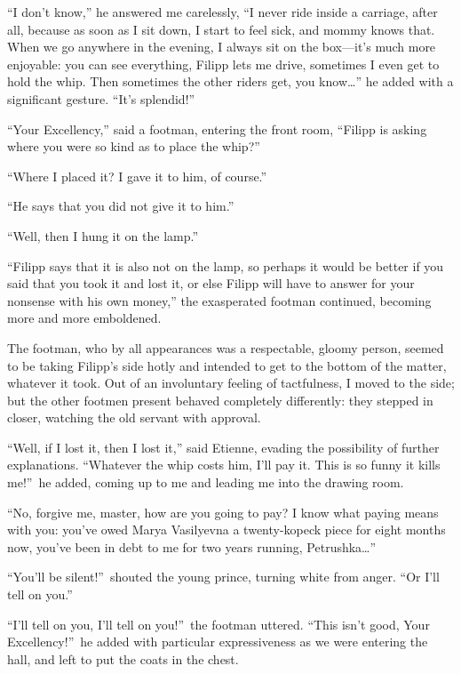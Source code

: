 ``I don't know,'' he answered me carelessly, ``I never ride inside a carriage, after all, because as soon as I sit down, I start to feel sick, and mommy knows that. When we go anywhere in the evening, I always sit on the box---it's much more enjoyable: you can see everything, Filipp lets me drive, sometimes I even get to hold the whip. Then sometimes the other riders get, you know\ldots{}'' he added with a significant gesture. ``It's splendid!'' %

``Your Excellency,'' said a footman, entering the front room, ``Filipp is asking where you were so kind as to place the whip?'' %

``Where I placed it? I gave it to him, of course.'' %

``He says that you did not give it to him.'' %

``Well, then I hung it on the lamp.'' %

``Filipp says that it is also not on the lamp, so perhaps it would be better if you said that you took it and lost it, or else Filipp will have to answer for your nonsense with his own money,'' the exasperated footman continued, becoming more and more emboldened. %

The footman, who by all appearances was a respectable, gloomy person, seemed to be taking Filipp's side hotly and intended to get to the bottom of the matter, whatever it took. Out of an involuntary feeling of tactfulness, I moved to the side; but the other footmen present behaved completely differently: they stepped in closer, watching the old servant with approval.

``Well, if I lost it, then I lost it,'' said Etienne, evading the possibility of further explanations. ``Whatever the whip costs him, I'll pay it. This is so funny it kills me!''~he added, coming up to me and leading me into the drawing room. %

``No, forgive me, master, how are you going to pay? I know what paying means with you: you've owed Marya Vasilyevna a twenty-kopeck piece for eight months now, you've been in debt to me for two years running, Petrushka\ldots{}'' %

``You'll be silent!''~shouted the young prince, turning white from anger. ``Or I'll tell on you.'' %

``I'll tell on you, I'll tell on you!''~the footman uttered. ``This isn't good, Your Excellency!''~he added with particular expressiveness as we were entering the hall, and left to put the coats in the chest.

